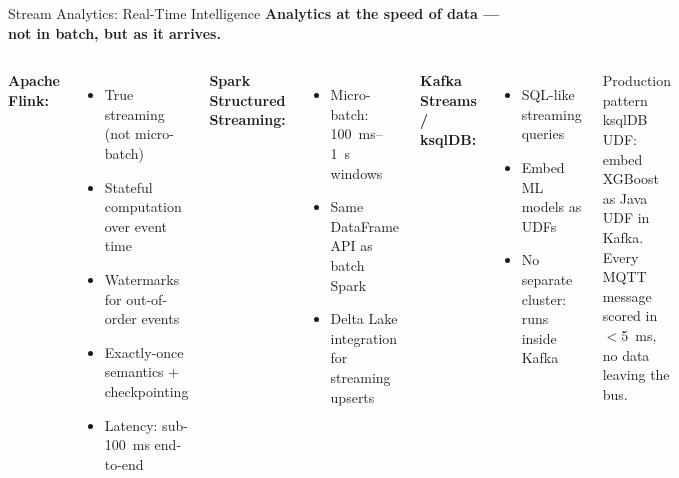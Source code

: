 \documentclass[aspectratio=169,11pt]{beamer}
\begin{document}
\begin{frame}{Stream Analytics: Real-Time Intelligence}
    \small
    \textbf{Analytics at the speed of data --- not in batch, but as it arrives.}

    \vspace{0.05cm}
    \begin{columns}
        \textbf{Apache Flink:}
        \begin{itemize}\setlength{\itemsep}{0pt}
            \item True streaming (not micro-batch)
            \item Stateful computation over event time
            \item Watermarks for out-of-order events
            \item Exactly-once semantics + checkpointing
            \item Latency: sub-100~ms end-to-end
        \end{itemize}

        \vspace{0.05cm}
        \textbf{Spark Structured Streaming:}
        \begin{itemize}\setlength{\itemsep}{0pt}
            \item Micro-batch: 100~ms--1~s windows
            \item Same DataFrame API as batch Spark
            \item Delta Lake integration for streaming upserts
        \end{itemize}

        \textbf{Kafka Streams / ksqlDB:}
        \begin{itemize}\setlength{\itemsep}{0pt}
            \item SQL-like streaming queries
            \item Embed ML models as UDFs
            \item No separate cluster: runs inside Kafka
        \end{itemize}

        \vspace{0.05cm}
        \begin{exampleblock}{Production pattern}
            ksqlDB UDF: embed XGBoost as Java UDF in Kafka. Every MQTT message scored in $<$5~ms, no data leaving the bus.
        \end{exampleblock}
    \end{columns}
\end{frame}
\end{document}
